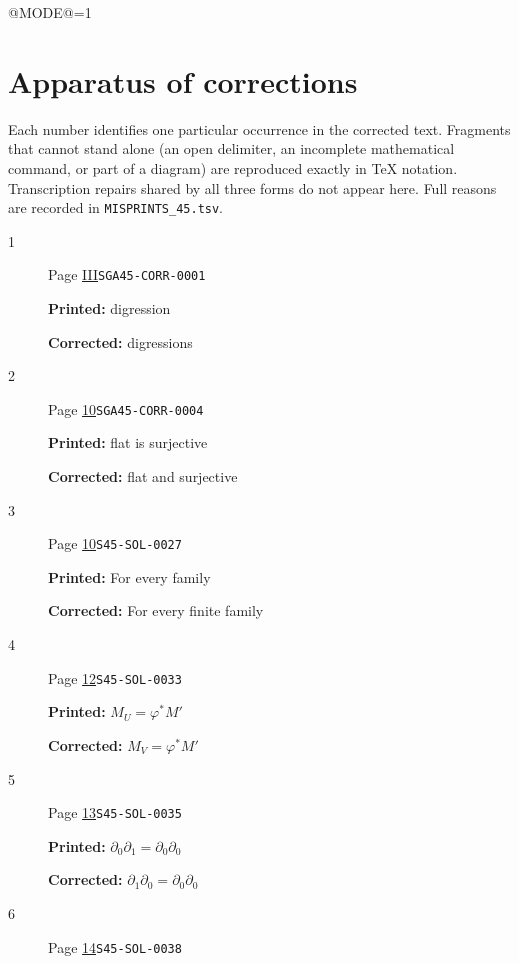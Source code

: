 \documentclass[oneside]{book}
\makeatletter
\theoremstyle{sga-source}
\theoremstyle{sga-source-dash}
\theoremstyle{sga-source-dotdash}
\theoremstyle{sga-source-number-note-dash}
\theoremstyle{sga-source-note-number-dotdash}
\theoremstyle{sga-source-example-dotdash}
\theoremstyle{sga-source-inline-number}
\theoremstyle{sga-source-bare-number}
\theoremstyle{sga-source}
\providecommand\EditionMode{@MODE@}
\makeatother
\begin{document}
\ifnum\EditionMode=1\relax
\clearpage
\chapter*{Apparatus of corrections}
Each number identifies one particular occurrence in the corrected text. Fragments that cannot stand alone (an open delimiter, an incomplete mathematical command, or part of a diagram) are reproduced exactly in TeX notation. Transcription repairs shared by all three forms do not appear here. Full reasons are recorded in \texttt{MISPRINTS\_45.tsv}.
\begingroup\small
\begin{description}
\item[\hypertarget{apparatus:EN-0001}{1}] Page \hyperlink{printpage:en:III}{III}\quad\texttt{SGA45-CORR-0001}
\par\noindent\textbf{Printed:} digression
\par\noindent\textbf{Corrected:} digressions
\smallskip
\item[\hypertarget{apparatus:EN-0002}{2}] Page \hyperlink{printpage:en:10}{10}\quad\texttt{SGA45-CORR-0004}
\par\noindent\textbf{Printed:} flat is surjective
\par\noindent\textbf{Corrected:} flat and surjective
\smallskip
\item[\hypertarget{apparatus:EN-0003}{3}] Page \hyperlink{printpage:en:10}{10}\quad\texttt{S45-SOL-0027}
\par\noindent\textbf{Printed:} For every family
\par\noindent\textbf{Corrected:} For every finite family
\smallskip
\item[\hypertarget{apparatus:EN-0004}{4}] Page \hyperlink{printpage:en:12}{12}\quad\texttt{S45-SOL-0033}
\par\noindent\textbf{Printed:} \(M_U=\varphi^*M'\)
\par\noindent\textbf{Corrected:} \(M_V=\varphi^*M'\)
\smallskip
\item[\hypertarget{apparatus:EN-0005}{5}] Page \hyperlink{printpage:en:13}{13}\quad\texttt{S45-SOL-0035}
\par\noindent\textbf{Printed:} \(\partial_0\partial_1=\partial_0\partial_0\)
\par\noindent\textbf{Corrected:} \(\partial_1\partial_0=\partial_0\partial_0\)
\smallskip
\item[\hypertarget{apparatus:EN-0006}{6}] Page \hyperlink{printpage:en:14}{14}\quad\texttt{S45-SOL-0038}

\end{description}
\end{document}
